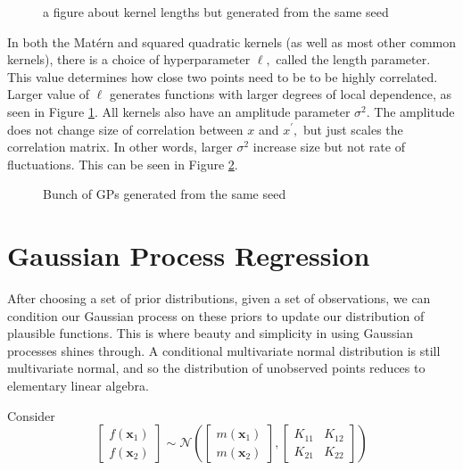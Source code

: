 \begin{figure}
    \caption{a figure about kernel lengths but generated from the same seed}
    \label{fig:no_reg_lengths}
\end{figure}

In both the Mat\'ern and squared quadratic kernels
(as well as most other common kernels), there is a choice of
hyperparameter $\ell,$ called
the length parameter. This value determines how close two points need to be to
be highly correlated. Larger value of $\ell$ generates functions with larger
degrees of local dependence, as seen in Figure \ref{fig:no_reg_lengths}. All kernels
also have an amplitude parameter $\sigma^2.$ The amplitude does not change size
of correlation between $x$ and $x^\prime,$ but just scales the correlation
matrix. In other words, larger $\sigma^2$ increase size but not rate of
fluctuations. This can be seen in Figure \ref{fig:no_reg_amps}.

\begin{figure}
    \caption{Bunch of GPs generated from the same seed}
    \label{fig:no_reg_amps}
\end{figure}

\section{Gaussian Process Regression}

After choosing a set of prior distributions, given a set of observations, we
can condition our Gaussian process on these priors to update our distribution
of plausible functions. This is where beauty and simplicity in using Gaussian
processes shines through. A conditional multivariate normal distribution
is still multivariate normal, and so the distribution of unobserved points
reduces to elementary linear algebra.

Consider
$$
    \begin{bmatrix}
        f(\mathbf{x}_1) \\
        f(\mathbf{x}_2)
    \end{bmatrix} \sim \mathcal{N}\left(
    \begin{bmatrix}
            m(\mathbf{x}_1) \\
            m(\mathbf{x}_2)
        \end{bmatrix}, \begin{bmatrix}
            K_{11} & K_{12} \\
            K_{21} & K_{22}
        \end{bmatrix}
    \right)
$$


